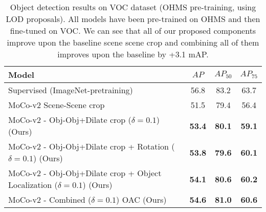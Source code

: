 \begin{table*}
    \centering
    \begin{tabu} to \linewidth {lccc} 
        \toprule
        Model & $AP$ & $AP_{50}$ & $AP_{75}$ \\
         \midrule
    Supervised (ImageNet-pretraining) & 56.8 & 83.2 & 63.7 \\
     \midrule
    
    MoCo-v2 Scene-Scene crop \citep{chen2020improved}  & 51.5 & 79.4 & 56.4\\
    \midrule
    MoCo-v2 - Obj-Obj+Dilate  crop ($\delta=0.1$) (Ours) &  \textbf{53.4} &  \textbf{80.1} & \textbf{59.1}\\
    MoCo-v2 - Obj-Obj+Dilate  crop + Rotation ($\delta=0.1$) (Ours) &  \textbf{53.8} &  \textbf{79.6} & \textbf{60.1}\\
    MoCo-v2 - Obj-Obj+Dilate  crop + Object Localization ($\delta=0.1$) (Ours) &  \textbf{54.1} &  \textbf{80.6} & \textbf{60.2}\\
    \midrule
    MoCo-v2 - Combined ($\delta=0.1$) OAC (Ours) &  \textbf{54.6} &  \textbf{81.0} & \textbf{60.6}\\
     \bottomrule
    \end{tabu}
    \caption{Object detection results on VOC dataset (OHMS pre-training, using LOD proposals). All models have been pre-trained on OHMS and then fine-tuned on VOC. We can see that all of our proposed components improve upon the baseline scene scene crop and combining all of them improves upon the baseline by +3.1 mAP. }
    \label{tab:voc_moco}
    
\end{table*}


